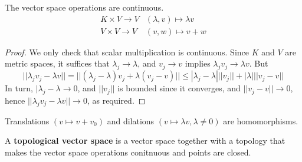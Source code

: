 \documentclass{article}
\begin{document}
\begin{fact}
    The vector space operations are continuous.
    \begin{align}
        K \times V \to V & (\lambda, v) \mapsto \lambda v \\
        V \times V \to V & (v, w) \mapsto v + w
    \end{align}
\end{fact}
\begin{proof}
    We only check that scalar multiplication is continuous. Since $K$ and $V$ are metric spaces, it suffices that $\lambda_j \to \lambda$, and $v_j \to v$ implies $\lambda_j v_j \to \lambda v$. But
    \begin{equation}
        ||\lambda_j v_j - \lambda v|| = ||(\lambda_j - \lambda) v_j + \lambda(v_j - v)|| \leq |\lambda_j - \lambda| ||v_j|| + |\lambda| ||v_j - v||
    \end{equation}
    In turn, $|\lambda_j - \lambda \to 0$, and $||v_j||$ is bounded since it converges, and $||v_j - v|| \to 0$, hence $||\lambda_j v_j - \lambda v|| \to 0$, as required.
\end{proof}
\begin{cor}
    Translations $(v \mapsto v + v_0)$ and dilations $(v \mapsto \lambda v, \lambda \ne 0)$ are homomorphisms.
\end{cor}

\begin{defi}
    A \textbf{topological vector space} is a vector space together with a topology that makes the vector space operations conitnuous and points are closed.
\end{defi}
\end{document}
